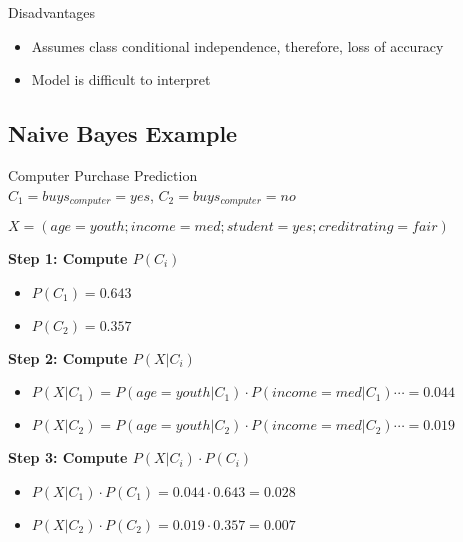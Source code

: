 \begin{concept}{Disadvantages}
\begin{itemize}
    \item Assumes class conditional independence, therefore, loss of accuracy
    \item Model is difficult to interpret
\end{itemize}
\end{concept}

\subsection{Naive Bayes Example}

\begin{example2}{Computer Purchase Prediction}\\
$C_1 = buys_{computer} = yes$, $C_2 = buys_{computer} = no$

$X = (age = youth; income = med; student = yes; creditrating = fair)$

\textbf{Step 1: Compute $P(C_i)$}
\begin{itemize}
    \item $P(C_1) = 0.643$
    \item $P(C_2) = 0.357$
\end{itemize}

\textbf{Step 2: Compute $P(X|C_i)$}
\begin{itemize}
    \item $P(X|C_1) = P(age = youth|C_1) \cdot P(income = med|C_1) \cdots = 0.044$
    \item $P(X|C_2) = P(age = youth|C_2) \cdot P(income = med|C_2) \cdots = 0.019$
\end{itemize}

\textbf{Step 3: Compute $P(X|C_i) \cdot P(C_i)$}
\begin{itemize}
    \item $P(X|C_1) \cdot P(C_1) = 0.044 \cdot 0.643 = 0.028$
    \item $P(X|C_2) \cdot P(C_2) = 0.019 \cdot 0.357 = 0.007$
\end{itemize}
\end{example2}

